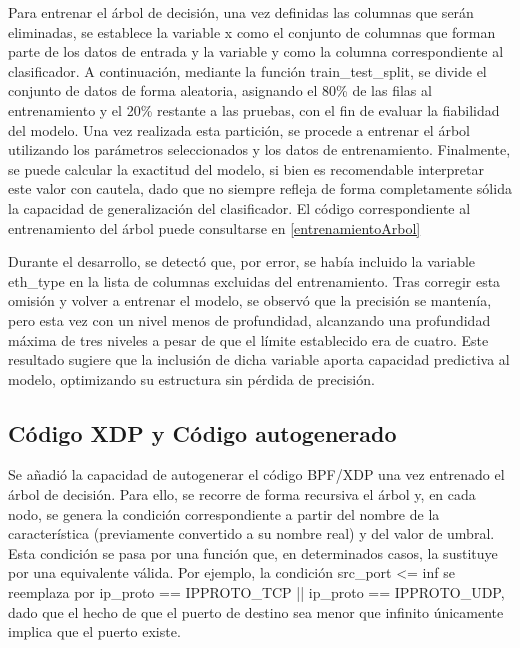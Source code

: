 Para entrenar el árbol de decisión, una vez definidas las columnas que serán eliminadas, se establece la variable x como el conjunto de columnas que forman parte de los datos de entrada y la variable y como la columna correspondiente al clasificador. A continuación, mediante la función train\_test\_split, se divide el conjunto de datos de forma aleatoria, asignando el 80\% de las filas al entrenamiento y el 20\% restante a las pruebas, con el fin de evaluar la fiabilidad del modelo. Una vez realizada esta partición, se procede a entrenar el árbol utilizando los parámetros seleccionados y los datos de entrenamiento. Finalmente, se puede calcular la exactitud del modelo, si bien es recomendable interpretar este valor con cautela, dado que no siempre refleja de forma completamente sólida la capacidad de generalización del clasificador. El código correspondiente al entrenamiento del árbol puede consultarse en \ref{entrenamientoArbol}

Durante el desarrollo, se detectó que, por error, se había incluido la variable eth\_type en la lista de columnas excluidas del entrenamiento. Tras corregir esta omisión y volver a entrenar el modelo, se observó que la precisión se mantenía, pero esta vez con un nivel menos de profundidad, alcanzando una profundidad máxima de tres niveles a pesar de que el límite establecido era de cuatro. Este resultado sugiere que la inclusión de dicha variable aporta capacidad predictiva al modelo, optimizando su estructura sin pérdida de precisión.



\subsection{Código XDP y Código autogenerado}
Se añadió la capacidad de autogenerar el código BPF/XDP una vez entrenado el árbol de decisión. Para ello, se recorre de forma recursiva el árbol y, en cada nodo, se genera la condición correspondiente a partir del nombre de la característica (previamente convertido a su nombre real) y del valor de umbral. Esta condición se pasa por una función que, en determinados casos, la sustituye por una equivalente válida. Por ejemplo, la condición src\_port <= inf se reemplaza por ip\_proto == IPPROTO\_TCP || ip\_proto == IPPROTO\_UDP, dado que el hecho de que el puerto de destino sea menor que infinito únicamente implica que el puerto existe.


